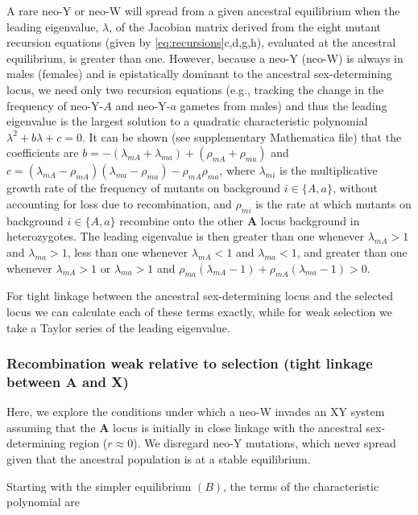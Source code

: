 \documentclass[12pt]{article}
\begin{document}
A rare neo-Y or neo-W will spread from a given ancestral equilibrium when the leading eigenvalue, $\lambda$, of the Jacobian matrix derived from the eight mutant recursion equations (given by \ref{eq:recursions}c,d,g,h), evaluated at the ancestral equilibrium, is greater than one.
However, because a neo-Y (neo-W) is always in males (females) and is epistatically dominant to the ancestral sex-determining locus, we need only two recursion equations (e.g., tracking the change in the frequency of neo-Y-$A$ and neo-Y-$a$ gametes from males) and thus the leading eigenvalue is the largest solution to a quadratic characteristic polynomial $\lambda^2 + b\lambda + c = 0$.
It can be shown (see supplementary Mathematica file) that the coefficients are $b= - (\lambda_{mA} + \lambda_{ma})+(\rho_{mA} + \rho_{ma})$ and $c = (\lambda_{mA}-\rho_{mA}) (\lambda_{ma}-\rho_{ma}) -\rho_{mA} \rho_{ma}$, where $\lambda_{mi}$ is the multiplicative growth rate of the frequency of mutants on background $i\in\{A,a\}$, without accounting for loss due to recombination, and $\rho_{mi}$ is the rate at which mutants on background $i\in\{A,a\}$ recombine onto the other \textbf{A} locus background in heterozygotes.
The leading eigenvalue is then greater than one whenever $\lambda_{mA}>1$ and $\lambda_{ma}>1$, less than one whenever $\lambda_{mA}<1$ and $\lambda_{ma}<1$, and greater than one whenever  $\lambda_{mA}>1$ or $\lambda_{ma}>1$ and $\rho_{ma} (\lambda_{mA}-1) + \rho_{mA} (\lambda_{ma}-1) > 0$.

For tight linkage between the ancestral sex-determining locus and the selected locus we can calculate each of these terms exactly, while for weak selection we take a Taylor series of the leading eigenvalue. 

\subsubsection*{Recombination weak relative to selection (tight linkage between \textbf{A} and \textbf{X})}

Here, we explore the conditions under which a neo-W invades an XY system assuming that the \textbf{A} locus is initially in close linkage with the ancestral sex-determining region ($r \approx 0$). 
We disregard neo-Y mutations, which never spread given that the ancestral population is at a stable equilibrium. 



Starting with the simpler equilibrium $(B)$, the terms of the characteristic polynomial are
\end{document}
